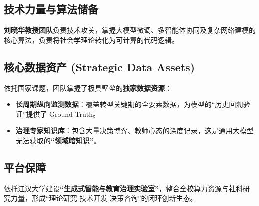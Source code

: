 \documentclass[12pt,a4paper,fontset=mac]{ctexart}
\begin{document}
\subsection{技术力量与算法储备}
\textbf{刘晓华教授团队}负责技术攻关，掌握大模型微调、多智能体协同及复杂网络建模的核心算法，负责将社会学理论转化为可计算的代码逻辑。

\subsection{核心数据资产 (Strategic Data Assets)}
依托国家课题，团队掌握了极具壁垒的\textbf{独家数据资源}：
\begin{itemize}
    \item \textbf{长周期纵向监测数据}：覆盖转型关键期的全要素数据，为模型的“历史回溯验证”提供了 Ground Truth。
    \item \textbf{治理专家知识库}：包含大量决策博弈、教师心态的深度记录，这是通用大模型无法获取的\textbf{“领域暗知识”}。
\end{itemize}

\subsection{平台保障}
依托江汉大学建设\textbf{“生成式智能与教育治理实验室”}，整合全校算力资源与社科研究力量，形成“理论研究-技术开发-决策咨询”的闭环创新生态。

\vspace{1cm}

 
\end{document}
